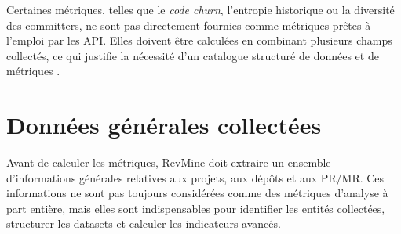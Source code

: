 Certaines métriques, telles que le \textit{code churn}, l’entropie historique ou la diversité des committers, ne sont pas directement fournies comme métriques prêtes à l’emploi par les API. Elles doivent être calculées en combinant plusieurs champs collectés, ce qui justifie la nécessité d’un catalogue structuré de données et de métriques \cite{hassan2009predicting,bavota2015four,thongtanunam2015reviewer}.

\section{Données générales collectées}
Avant de calculer les métriques, RevMine doit extraire un ensemble d’informations générales relatives aux projets, aux dépôts et aux PR/MR. Ces informations ne sont pas toujours considérées comme des métriques d’analyse à part entière, mais elles sont indispensables pour identifier les entités collectées, structurer les datasets et calculer les indicateurs avancés.

